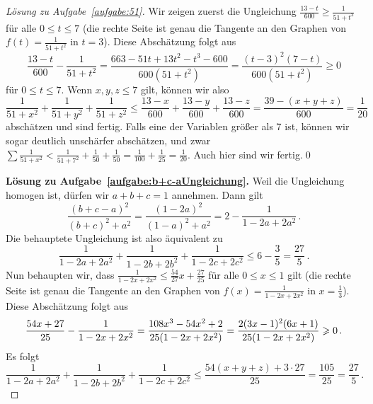 \begin{proof}[Lösung zu Aufgabe~\ref{aufgabe:51}]
	Wir zeigen zuerst die Ungleichung $\frac{13-t}{600}\geqslant\frac1{51+t^2}$ für alle $0\leqslant t\leqslant7$ (die rechte Seite ist genau die Tangente an den Graphen von $f(t)=\frac{1}{51+t^2}$ in $t=3$). Diese Abschätzung folgt aus
	\begin{equation*}
		\frac{13-t}{600}-\frac1{51+t^2}=\frac{663-51t+13t^2-t^3-600}{600(51+t^2)}=\frac{(t-3)^2(7-t)}{600(51+t^2)}\geqslant0
	\end{equation*}für $0\leqslant t\leqslant7$. Wenn $x,y,z\leqslant7$ gilt, können wir also
	\begin{equation*}
		\frac1{51+x^2}+\frac1{51+y^2}+\frac1{51+z^2}\leqslant\frac{13-x}{600}+\frac{13-y}{600}+\frac{13-z}{600}=\frac{39-(x+y+z)}{600}=\frac1{20}
	\end{equation*}
	abschätzen und sind fertig. Falls eine der Variablen größer als 7 ist, können wir sogar deutlich unschärfer abschätzen, und zwar $\sum\frac1{51+x^2}<\frac1{51+7^2}+\frac1{50}+\frac1{50}= \frac1{100}+\frac1{25}=\frac1{20}$. Auch hier sind wir fertig.\qed
	
	\textbf{Lösung zu Aufgabe~\ref{aufgabe:b+c-aUngleichung}.} Weil die Ungleichung homogen ist, dürfen wir $a+b+c=1$ annehmen. Dann gilt
	\begin{equation*}
		\frac{(b+c-a)^2}{(b+c)^2+a^2}=\frac{(1-2a)^2}{(1-a)^2+a^2}=2-\frac{1}{1-2a+2a^2}\,.
	\end{equation*}
	Die behauptete Ungleichung ist also äquivalent zu
	\begin{equation*}
		\frac{1}{1-2a+2a^2}+\frac{1}{1-2b+2b^2}+\frac{1}{1-2c+2c^2}\leqslant 6-\frac35=\frac{27}{5}\,.
	\end{equation*}
	Nun behaupten wir, dass $\frac{1}{1-2x+2x^2}\leqslant \frac{54}{27}x+\frac{27}{25}$ für alle $0\leqslant x\leqslant 1$ gilt (die rechte Seite ist genau die Tangente an den Graphen von $f(x)=\frac{1}{1-2x+2x^2}$ in $x=\frac13$). Diese Abschätzung folgt aus
	\begin{equation*}
		\frac{54x+27}{25}-\frac{1}{1-2x+2x^2}=\frac{108x^3-54x^2+2}{25\parens*{1-2x+2x^2}}=\frac{2(3x-1)^2(6x+1)}{25(1-2x+2x^2)}\geqslant 0\,.
	\end{equation*}
	Es folgt
	\begin{equation*}
		\frac{1}{1-2a+2a^2}+\frac{1}{1-2b+2b^2}+\frac{1}{1-2c+2c^2}\leqslant \frac{54(x+y+z)+3\cdot 27}{25}=\frac{105}{25}=\frac{27}{5}\,.\tag*{\qed}
	\end{equation*}
	

\end{proof}
